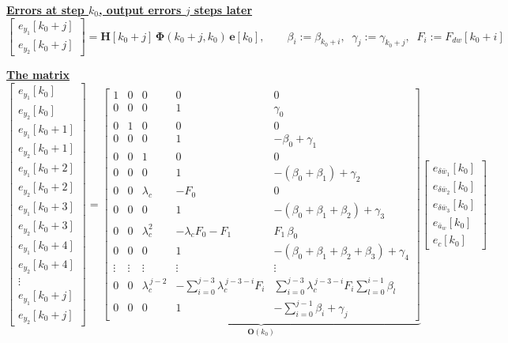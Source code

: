 \documentclass[11pt,a4paper]{ctexart}
\newcommand{\lc}{\lambda_c}
\newcommand{\ba}{\bar{a}}
\newcommand{\bw}{\bar{w}}
\newcommand{\hd}[1]{\par\bigskip\noindent\underline{\textbf{#1}}}
\begin{document}
\hd{Errors at step $k_0$, output errors $j$ steps later}
\[
\begin{bmatrix} e_{y_1}[k_0+j] \\ e_{y_2}[k_0+j] \end{bmatrix}
= \mathbf{H}[k_0+j]\,\bm{\Phi}(k_0+j,k_0)\,\mathbf{e}[k_0],
\qquad \beta_i := \beta_{k_0+i}, \;\; \gamma_j := \gamma_{k_0+j}, \;\; F_i := F_{dw}[k_0+i]
\]

\hd{The matrix}
{\small
\[
\begin{bmatrix} e_{y_1}[k_0] \\ e_{y_2}[k_0] \\[0.3ex] e_{y_1}[k_0+1] \\ e_{y_2}[k_0+1] \\[0.3ex] e_{y_1}[k_0+2] \\ e_{y_2}[k_0+2] \\[0.3ex] e_{y_1}[k_0+3] \\ e_{y_2}[k_0+3] \\[0.3ex] e_{y_1}[k_0+4] \\ e_{y_2}[k_0+4] \\ \vdots \\ e_{y_1}[k_0+j] \\ e_{y_2}[k_0+j] \end{bmatrix}
=
\underbrace{\begin{bmatrix}
1 & 0 & 0 & 0 & 0 \\
0 & 0 & 0 & 1 & \gamma_0 \\[0.3ex]
0 & 1 & 0 & 0 & 0 \\
0 & 0 & 0 & 1 & -\beta_0 + \gamma_1 \\[0.3ex]
0 & 0 & 1 & 0 & 0 \\
0 & 0 & 0 & 1 & -(\beta_0 + \beta_1) + \gamma_2 \\[0.3ex]
0 & 0 & \lc & -F_0 & 0 \\
0 & 0 & 0 & 1 & -(\beta_0 + \beta_1 + \beta_2) + \gamma_3 \\[0.3ex]
0 & 0 & \lc^2 & -\lc F_0 - F_1 & F_1\,\beta_0 \\
0 & 0 & 0 & 1 & -(\beta_0 + \beta_1 + \beta_2 + \beta_3) + \gamma_4 \\
\vdots & \vdots & \vdots & \vdots & \vdots \\
0 & 0 & \lc^{\,j-2} & -\textstyle\sum_{i=0}^{j-3}\lc^{\,j-3-i}F_i & \textstyle\sum_{i=0}^{j-3}\lc^{\,j-3-i}F_i \sum_{l=0}^{i-1}\beta_l \\
0 & 0 & 0 & 1 & -\textstyle\sum_{i=0}^{j-1}\beta_i + \gamma_j
\end{bmatrix}}_{\mathbf{O}(k_0)}
\begin{bmatrix} e_{\delta\bw_1}[k_0] \\ e_{\delta\bw_2}[k_0] \\ e_{\delta\bw_3}[k_0] \\ e_{\ba_w}[k_0] \\ e_c[k_0] \end{bmatrix}
\]
}
\end{document}
